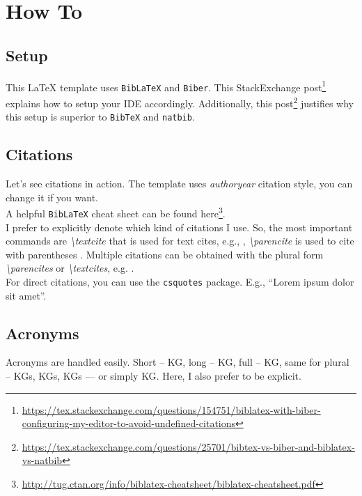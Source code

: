 \chapter{How To}
\label{chapter:how-to}

\section{Setup}
\label{sec:setup}
This \LaTeX\xspace template uses \texttt{BibLaTeX} and \texttt{Biber}. This StackExchange post\footnote{\url{https://tex.stackexchange.com/questions/154751/biblatex-with-biber-configuring-my-editor-to-avoid-undefined-citations}} explains how to setup your IDE accordingly. Additionally, this post\footnote{\url{https://tex.stackexchange.com/questions/25701/bibtex-vs-biber-and-biblatex-vs-natbib}} justifies why this setup is superior to \texttt{BibTeX} and \texttt{natbib}.

\section{Citations}
\label{sec:citations}
Let's see citations in action. The template uses \textit{authoryear} citation style, you can change it if you want.\\
A helpful \texttt{BibLaTeX} cheat sheet can be found here\footnote{\url{http://tug.ctan.org/info/biblatex-cheatsheet/biblatex-cheatsheet.pdf}}.\\
I prefer to explicitly denote which kind of citations I use. So, the most important commands are \textit{\textbackslash textcite} that is used for text cites, e.g., \textcite{bordes_translating_2013}, \textit{\textbackslash parencite} is used to cite with parentheses \parencite{bordes_translating_2013}. Multiple citations can be obtained with the plural form \textit{\textbackslash parencites} or \textit{\textbackslash textcites}, e.g. \parencites[e.g.][]{cauchy_methode_1847}{bordes_translating_2013}{nickel_review_2016}.\\
For direct citations, you can use the \texttt{csquotes} package. E.g., \enquote{Lorem ipsum \textelp{} dolor sit amet}.

\section{Acronyms}
\label{sec:acronyms}
Acronyms are handled easily. Short -- \acs{KG}, long -- \acl{KG}, full -- \acf{KG}, same for plural -- \acsp{KG}, \aclp{KG}, \acfp{KG} --- or simply \ac{KG}. Here, I also prefer to be explicit.

